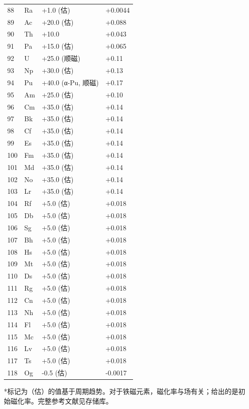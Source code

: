 \documentclass[12pt,a4paper]{article}
\begin{document}
\begin{longtable}{p{0.6cm}p{1.2cm}p{2.5cm}p{2.5cm}}
		88 & Ra & +1.0 (估) & +0.0044 \\
		89 & Ac & +20.0 (估) & +0.088 \\
		90 & Th & +10.0 & +0.043 \\
		91 & Pa & +15.0 (估) & +0.065 \\
		92 & U  & +25.0 (顺磁) & +0.11 \\
		93 & Np & +30.0 (估) & +0.13 \\
		94 & Pu & +40.0 (α-Pu, 顺磁) & +0.17 \\
		95 & Am & +25.0 (估) & +0.10 \\
		96 & Cm & +35.0 (估) & +0.14 \\
		97 & Bk & +35.0 (估) & +0.14 \\
		98 & Cf & +35.0 (估) & +0.14 \\
		99 & Es & +35.0 (估) & +0.14 \\
		100& Fm & +35.0 (估) & +0.14 \\
		101& Md & +35.0 (估) & +0.14 \\
		102& No & +35.0 (估) & +0.14 \\
		103& Lr & +35.0 (估) & +0.14 \\
		104& Rf & +5.0 (估) & +0.018 \\
		105& Db & +5.0 (估) & +0.018 \\
		106& Sg & +5.0 (估) & +0.018 \\
		107& Bh & +5.0 (估) & +0.018 \\
		108& Hs & +5.0 (估) & +0.018 \\
		109& Mt & +5.0 (估) & +0.018 \\
		110& Ds & +5.0 (估) & +0.018 \\
		111& Rg & +5.0 (估) & +0.018 \\
		112& Cn & +5.0 (估) & +0.018 \\
		113& Nh & +5.0 (估) & +0.018 \\
		114& Fl & +5.0 (估) & +0.018 \\
		115& Mc & +5.0 (估) & +0.018 \\
		116& Lv & +5.0 (估) & +0.018 \\
		117& Ts & +5.0 (估) & +0.018 \\
		118& Og & -0.5 (估) & -0.0017 \\
		\bottomrule
	\end{longtable}
	*标记为（估）的值基于周期趋势。对于铁磁元素，磁化率与场有关；给出的是初始磁化率。完整参考文献见存储库。
	
	
\end{document}
